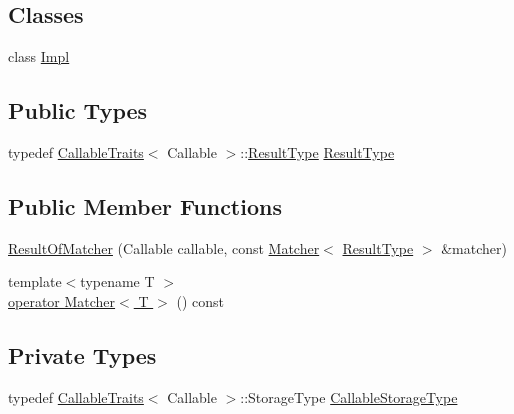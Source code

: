\subsection*{Classes}
\begin{DoxyCompactItemize}
\item 
class \hyperlink{classtesting_1_1internal_1_1ResultOfMatcher_1_1Impl}{Impl}
\end{DoxyCompactItemize}
\subsection*{Public Types}
\begin{DoxyCompactItemize}
\item 
typedef \hyperlink{structtesting_1_1internal_1_1CallableTraits}{Callable\+Traits}$<$ Callable $>$\+::\hyperlink{classtesting_1_1internal_1_1ResultOfMatcher_aa9db2267792fcae2cfa3f57683f4e048}{Result\+Type} \hyperlink{classtesting_1_1internal_1_1ResultOfMatcher_aa9db2267792fcae2cfa3f57683f4e048}{Result\+Type}
\end{DoxyCompactItemize}
\subsection*{Public Member Functions}
\begin{DoxyCompactItemize}
\item 
\hyperlink{classtesting_1_1internal_1_1ResultOfMatcher_a77c27bcc81ff133c1117a7edf84df0b9}{Result\+Of\+Matcher} (Callable callable, const \hyperlink{classtesting_1_1Matcher}{Matcher}$<$ \hyperlink{classtesting_1_1internal_1_1ResultOfMatcher_aa9db2267792fcae2cfa3f57683f4e048}{Result\+Type} $>$ \&matcher)
\item 
{\footnotesize template$<$typename T $>$ }\\\hyperlink{classtesting_1_1internal_1_1ResultOfMatcher_ab537f63126b81ea991ff369becf7ad7e}{operator Matcher$<$ T $>$} () const
\end{DoxyCompactItemize}
\subsection*{Private Types}
\begin{DoxyCompactItemize}
\item 
typedef \hyperlink{structtesting_1_1internal_1_1CallableTraits}{Callable\+Traits}$<$ Callable $>$\+::Storage\+Type \hyperlink{classtesting_1_1internal_1_1ResultOfMatcher_a6f7f7d80162bebdf73681d6a3aa92c7d}{Callable\+Storage\+Type}
\end{DoxyCompactItemize}
